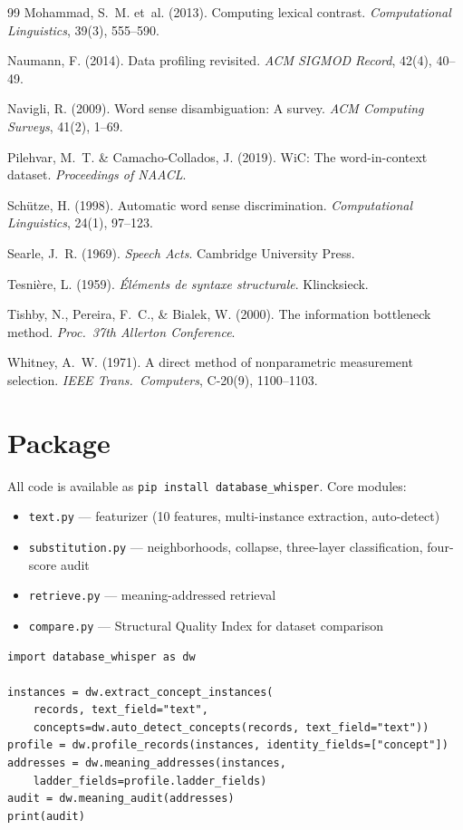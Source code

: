 \documentclass[11pt,a4paper]{article}
\begin{document}
\begin{thebibliography}{99}
Mohammad, S.~M. et~al. (2013).
Computing lexical contrast.
\emph{Computational Linguistics}, 39(3), 555--590.

Naumann, F. (2014).
Data profiling revisited.
\emph{ACM SIGMOD Record}, 42(4), 40--49.

Navigli, R. (2009).
Word sense disambiguation: A survey.
\emph{ACM Computing Surveys}, 41(2), 1--69.

Pilehvar, M.~T. \& Camacho-Collados, J. (2019).
WiC: The word-in-context dataset.
\emph{Proceedings of NAACL}.

Sch\"{u}tze, H. (1998).
Automatic word sense discrimination.
\emph{Computational Linguistics}, 24(1), 97--123.

Searle, J.~R. (1969).
\emph{Speech Acts}. Cambridge University Press.

Tesni\`{e}re, L. (1959).
\emph{\'{E}l\'{e}ments de syntaxe structurale}. Klincksieck.

Tishby, N., Pereira, F.~C., \& Bialek, W. (2000).
The information bottleneck method.
\emph{Proc.\ 37th Allerton Conference}.

Whitney, A.~W. (1971).
A direct method of nonparametric measurement selection.
\emph{IEEE Trans.\ Computers}, C-20(9), 1100--1103.

\end{thebibliography}

\appendix
\section{Package}

All code is available as \texttt{pip install database\_whisper}. Core modules:

\begin{itemize}
\item \texttt{text.py} --- featurizer (10 features, multi-instance extraction, auto-detect)
\item \texttt{substitution.py} --- neighborhoods, collapse, three-layer classification, four-score audit
\item \texttt{retrieve.py} --- meaning-addressed retrieval
\item \texttt{compare.py} --- Structural Quality Index for dataset comparison
\end{itemize}

\begin{verbatim}
import database_whisper as dw

instances = dw.extract_concept_instances(
    records, text_field="text",
    concepts=dw.auto_detect_concepts(records, text_field="text"))
profile = dw.profile_records(instances, identity_fields=["concept"])
addresses = dw.meaning_addresses(instances,
    ladder_fields=profile.ladder_fields)
audit = dw.meaning_audit(addresses)
print(audit)
\end{verbatim}
\end{document}
